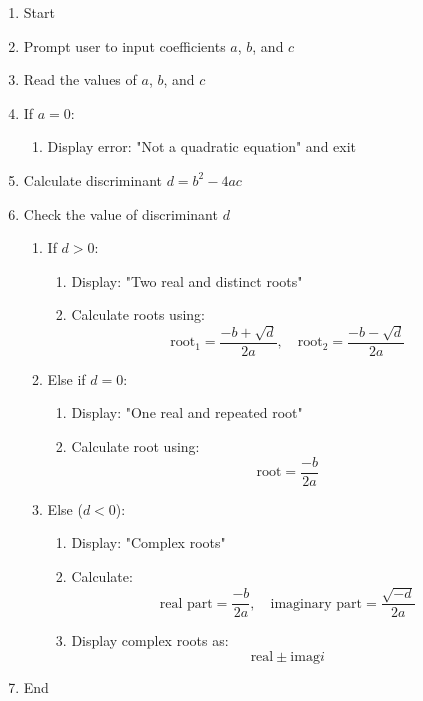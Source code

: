 \begin{enumerate}
    \item Start
    \item Prompt user to input coefficients $a$, $b$, and $c$
    \item Read the values of $a$, $b$, and $c$
    \item If $a = 0$:
    \begin{enumerate}
        \item Display error: "Not a quadratic equation" and exit
    \end{enumerate}
    \item Calculate discriminant $d = b^2 - 4ac$
    \item Check the value of discriminant $d$
    \begin{enumerate}
        \item If $d > 0$:
        \begin{enumerate}
            \item Display: "Two real and distinct roots"
            \item Calculate roots using:
            \[
            \text{root}_1 = \frac{-b + \sqrt{d}}{2a},\quad
            \text{root}_2 = \frac{-b - \sqrt{d}}{2a}
            \]
        \end{enumerate}
        \item Else if $d = 0$:
        \begin{enumerate}
            \item Display: "One real and repeated root"
            \item Calculate root using:
            \[
            \text{root} = \frac{-b}{2a}
            \]
        \end{enumerate}
        \item Else ($d < 0$):
        \begin{enumerate}
            \item Display: "Complex roots"
            \item Calculate:
            \[
            \text{real part} = \frac{-b}{2a},\quad
            \text{imaginary part} = \frac{\sqrt{-d}}{2a}
            \]
            \item Display complex roots as:
            \[
            \text{real} \pm \text{imag}i
            \]
        \end{enumerate}
    \end{enumerate}
    \item End
\end{enumerate}

